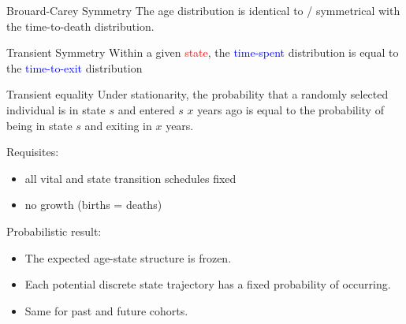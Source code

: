 \documentclass[20pt]{beamer}
\begin{document}

\begin{frame}[plain]
\Large
 \begin{block}{Brouard-Carey Symmetry}
  The age distribution is identical to / symmetrical with the time-to-death distribution.
 \end{block}
\end{frame}

\begin{frame}[plain]
\Large
 \begin{block}{Transient Symmetry}
  Within a given \textcolor{red}{state}, the \textcolor{blue}{time-spent} distribution is equal to the \textcolor{blue}{time-to-exit} distribution
 \end{block}
\end{frame}

\begin{frame}[plain]
\Large
 \begin{block}{Transient equality}
  Under stationarity, the probability that a randomly selected individual is in state $s$ and entered $s$ $x$ years ago is equal to the probability of being in state $s$ and exiting in $x$ years.
 \end{block}
\end{frame}

\begin{frame}[plain]
\Large
\centering
Requisites:
\begin{itemize}
\item all vital and state transition schedules fixed
\item no growth (births = deaths)
\end{itemize}
\end{frame}

\begin{frame}[plain]
\Large
\centering
Probabilistic result:
\begin{itemize}
\item The expected age-state structure is frozen.
\item Each potential discrete state trajectory has a fixed probability of
occurring.
\item Same for past and future cohorts.
\end{itemize}
\end{frame}
\end{document}
